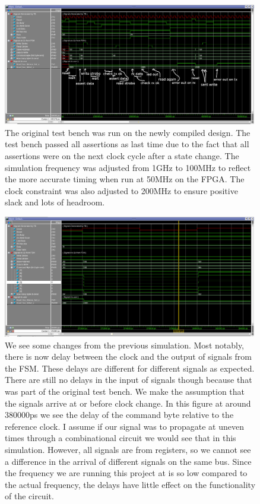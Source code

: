 \documentclass[11pt]{article}
\begin{document}
\begin{figure}[H]
    \centering
\includegraphics[width=0.99\textwidth]{delayed_wave2.png}
    \caption{The original test bench was run on the newly compiled design. The test bench passed all assertions as last time due to the fact that all assertions were on the next clock cycle after a state change. The simulation frequency was adjusted from 1GHz to 100MHz to reflect the more accurate timing when run at 50MHz on the FPGA. The clock constraint was also adjusted to 200MHz to ensure positive slack and lots of headroom. }
\end{figure}
\begin{figure}[H]
    \centering
\includegraphics[width=0.99\textwidth]{closeup_delayed_wave.png}
    \caption{We see some changes from the previous simulation. Most notably, there is now delay between the clock and the output of signals from the FSM. These delays are different for different signals as expected. There are still no delays in the input of signals though because that was part of the original test bench. We make the assumption that the signals arrive at or before clock change. In this figure at around 380000ps we see the delay of the command byte relative to the reference clock. I assume if our signal was to propagate at uneven times through a combinational circuit we would see that in this simulation. However, all signals are from registers, so we cannot see a difference in the arrival of different signals on the same bus. Since the frequency we are running this project at is so low compared to the actual frequency, the delays have little effect on the functionality of the circuit.}
\end{figure}
\end{document}
